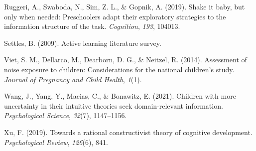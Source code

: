 \documentclass[10pt, letterpaper]{article}
\begin{document}
\leavevmode\hypertarget{ref-ruggeri2019}{}%
Ruggeri, A., Swaboda, N., Sim, Z. L., \& Gopnik, A. (2019). Shake it
baby, but only when needed: Preschoolers adapt their exploratory
strategies to the information structure of the task. \emph{Cognition},
\emph{193}, 104013.

\leavevmode\hypertarget{ref-settles2009}{}%
Settles, B. (2009). Active learning literature survey.

\leavevmode\hypertarget{ref-viet2014}{}%
Viet, S. M., Dellarco, M., Dearborn, D. G., \& Neitzel, R. (2014).
Assessment of noise exposure to children: Considerations for the
national children's study. \emph{Journal of Pregnancy and Child Health},
\emph{1}(1).

\leavevmode\hypertarget{ref-wang2021}{}%
Wang, J., Yang, Y., Macias, C., \& Bonawitz, E. (2021). Children with
more uncertainty in their intuitive theories seek domain-relevant
information. \emph{Psychological Science}, \emph{32}(7), 1147--1156.

\leavevmode\hypertarget{ref-xu2019}{}%
Xu, F. (2019). Towards a rational constructivist theory of cognitive
development. \emph{Psychological Review}, \emph{126}(6), 841.


\end{document}
